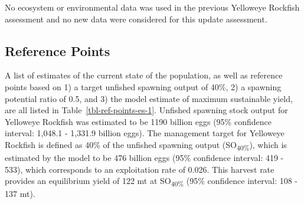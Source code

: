 \documentclass[
  english,
]{article}
\begin{document}
No ecosystem or environmental data was used in the previous Yelloweye
Rockfish assessment and no new data were considered for this update
assessment.

\subsection*{Reference Points}\label{reference-points}

A list of estimates of the current state of the population, as well as
reference points based on 1) a target unfished spawning output of 40\%,
2) a spawning potential ratio of 0.5, and 3) the model estimate of
maximum sustainable yield, are all listed in
Table~\ref{tbl-ref-points-es-1}. Unfished spawning stock output for
Yelloweye Rockfish was estimated to be 1190 billion eggs (95\%
confidence interval: 1,048.1 - 1,331.9 billion eggs). The management
target for Yelloweye Rockfish is defined as 40\% of the unfished
spawning output (SO\textsubscript{40\%}), which is estimated by the
model to be 476 billion eggs (95\% confidence interval: 419 - 533),
which corresponds to an exploitation rate of 0.026. This harvest rate
provides an equilibrium yield of 122 mt at SO\textsubscript{40\%} (95\%
confidence interval: 108 - 137 mt).

\clearpage

\begingroup
\fontsize{9.0pt}{11.0pt}\selectfont
\end{document}
